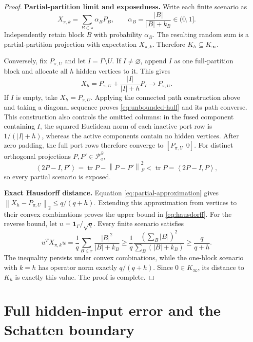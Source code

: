 \documentclass[11pt]{article}
\theoremstyle{definition}
\theoremstyle{remark}
\newcommand{\one}{\mathbf 1}
\newcommand{\tr}{\operatorname{tr}}
\newcommand{\cP}{\mathcal P}
\newcommand{\ip}[2]{\left\langle #1,#2\right\rangle}
\newcommand{\norm}[1]{\left\lVert #1\right\rVert}
\begin{document}
\begin{proof}
\textbf{Partial-partition limit and exposedness.}
Write each finite scenario as
\[
  X_{\pi,k}=\sum_{B\in\pi}\alpha_BP_B,
  \qquad \alpha_B=\frac{|B|}{|B|+k_B}\in(0,1].
\]
Independently retain block $B$ with probability $\alpha_B$.  The resulting
random sum is a partial-partition projection with expectation $X_{\pi,k}$.
Therefore $K_h\subseteq K_\infty$.

Conversely, fix $P_{\pi,U}$ and let $I=\Gamma\setminus U$.  If $I\neq
\varnothing$, append $I$ as one full-partition block and allocate all $h$
hidden vertices to it.  This gives
\begin{equation}
  X_h=P_{\pi,U}+\frac{|I|}{|I|+h}P_I\longrightarrow P_{\pi,U}.
  \label{eq:partial-approximation}
\end{equation}
If $I$ is empty, take $X_h=P_{\pi,U}$.  Applying the connected path
construction above and taking a diagonal sequence proves
\eqref{eq:unbounded-hull} and its path converse.  This construction also
controls the omitted columns: in the fused component containing $I$, the
squared Euclidean norm of each inactive port row is $1/(|I|+h)$, whereas the
active components contain no hidden vertices.  After zero padding, the full
port rows therefore converge to $[P_{\pi,U}\ \ 0]$.  For distinct orthogonal
projections $P,P'\in\cP_q^\partial$,
\begin{equation}
  \ip{2P-I}{P'}
  =\tr P-\norm{P-P'}_F^2
  <\tr P=\ip{2P-I}{P},
  \label{eq:partial-exposed}
\end{equation}
so every partial scenario is exposed.

\textbf{Exact Hausdorff distance.}
Equation \eqref{eq:partial-approximation} gives
$\norm{X_h-P_{\pi,U}}_2\leq q/(q+h)$.  Extending this approximation from
vertices to their convex combinations proves the upper bound in
\eqref{eq:hausdorff}.  For the reverse bound, let
$u=\one_\Gamma/\sqrt q$.  Every finite scenario satisfies
\begin{equation}
 u^TX_{\pi,k}u
 =\frac1q\sum_{B\in\pi}\frac{|B|^2}{|B|+k_B}
 \geq\frac1q\frac{(\sum_B|B|)^2}{\sum_B(|B|+k_B)}
 \geq\frac{q}{q+h}.
 \label{eq:hausdorff-lower}
\end{equation}
The inequality persists under convex combinations, while the one-block
scenario with $k=h$ has operator norm exactly $q/(q+h)$.  Since
$0\in K_\infty$, its distance to $K_h$ is exactly this value.  The proof is
complete.
\end{proof}

\section{Full hidden-input error and the Schatten boundary}
\end{document}
